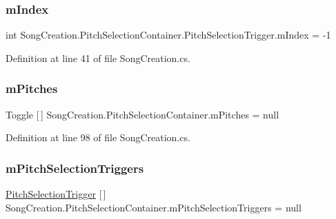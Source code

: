 \mbox{\label{group___s_c_handlers_ga6fa7a0883292035fef62858a69044010}} 
\subsubsection{\texorpdfstring{m\+Index}{mIndex}}
{\footnotesize\ttfamily int Song\+Creation.\+Pitch\+Selection\+Container.\+Pitch\+Selection\+Trigger.\+m\+Index = -\/1\hspace{0.3cm}{\ttfamily [private]}}



Definition at line 41 of file Song\+Creation.\+cs.

\mbox{\label{group___s_c_handlers_ga19dbd38f92df12e9b3d52b01634fdc53}} 
\subsubsection{\texorpdfstring{m\+Pitches}{mPitches}}
{\footnotesize\ttfamily Toggle \mbox{[}$\,$\mbox{]} Song\+Creation.\+Pitch\+Selection\+Container.\+m\+Pitches = null\hspace{0.3cm}{\ttfamily [private]}}



Definition at line 98 of file Song\+Creation.\+cs.

\mbox{\label{group___s_c_handlers_ga1affedf973b4aa39505b35053c12df7e}} 
\subsubsection{\texorpdfstring{m\+Pitch\+Selection\+Triggers}{mPitchSelectionTriggers}}
{\footnotesize\ttfamily \hyperlink{group___s_c_handlers_class_song_creation_1_1_pitch_selection_container_1_1_pitch_selection_trigger}{Pitch\+Selection\+Trigger} \mbox{[}$\,$\mbox{]} Song\+Creation.\+Pitch\+Selection\+Container.\+m\+Pitch\+Selection\+Triggers = null\hspace{0.3cm}{\ttfamily [private]}}



